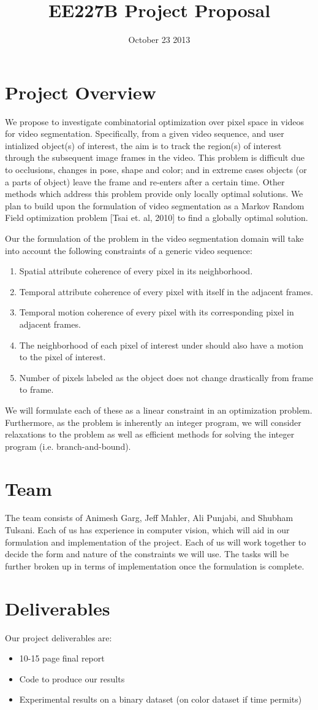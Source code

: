 \documentclass[10pt]{amsart}
\title{EE227B Project Proposal}
\date{October 23 2013}
\begin{document}
\maketitle
\vspace{-5ex}

\section{Project Overview}
We propose to investigate combinatorial optimization over pixel space in videos for video segmentation. Specifically, from a given video sequence, and user intialized object(s) of interest, the aim is to track the region(s) of interest through the subsequent image frames in the video. This problem is difficult due to occlusions, changes in pose, shape and color; and in extreme cases objects (or a parts of object) leave the frame and re-enters after a certain time. Other methods which address this problem provide only locally optimal solutions. We plan to build upon the formulation of video segmentation as a Markov Random Field optimization problem [Tsai et. al, 2010] to find a globally optimal solution.

Our the formulation of the problem in the video segmentation domain will take into account the following constraints of a generic video sequence:
\begin{enumerate}
	\item Spatial attribute coherence of every pixel in its neighborhood.
	\item Temporal attribute coherence of every pixel with itself in the adjacent frames.
	\item Temporal motion coherence of every pixel with its corresponding pixel in adjacent frames.
	\item The neighborhood of each pixel of interest under should also have a motion to the pixel of interest.
 	\item Number of pixels labeled as the object does not change drastically from frame to frame.
\end{enumerate}

We will formulate each of these as a linear constraint in an optimization problem. Furthermore, as the problem is inherently an integer program, we will consider relaxations to the problem as well as efficient methods for solving the integer program (i.e. branch-and-bound).

\section{Team}
The team consists of Animesh Garg, Jeff Mahler, Ali Punjabi, and Shubham Tulsani. Each of us has experience in computer vision, which will aid in our formulation and implementation of the project. Each of us will work together to decide the form and nature of the constraints we will use. The tasks will be further broken up in terms of implementation once the formulation is complete.

\section{Deliverables}
Our project deliverables are:
\begin{itemize}
	\item 10-15 page final report
	\item Code to produce our results
	\item Experimental results on a binary dataset (on color dataset if time permits)
\end{itemize}
\end{document}
